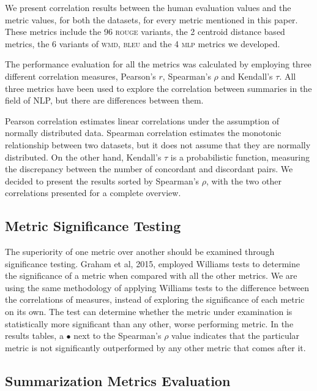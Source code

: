 \documentclass[11pt,a4paper]{article}
\newcommand{\rouge}{\textsc{rouge}\xspace}
\newcommand{\bleu}{\textsc{bleu}\xspace}
\newcommand{\mlp}{\textsc{mlp}\xspace}
\newcommand{\wmd}{\textsc{wmd}\xspace}
\begin{document}
We present correlation results between the human evaluation values and the metric 
values, for both the datasets, for every metric mentioned in this paper. These 
metrics include the 96 \rouge variants, the 2 centroid distance based metrics, 
the 6 variants of \wmd, \bleu and the 4 \mlp metrics we developed.

The performance evaluation for all the metrics was calculated by employing three 
different correlation measures, Pearson's $r$, Spearman's $\rho$ and Kendall's $\tau$. 
All three metrics have been used to explore the correlation between summaries in 
the field of NLP, but there are differences between them.

Pearson correlation estimates linear correlations under the assumption of normally 
distributed data. Spearman correlation estimates the monotonic relationship between 
two datasets, but it does not assume that they are normally distributed. On the other hand, 
Kendall's $\tau$ is a probabilistic function, measuring the discrepancy between the number 
of concordant and discordant pairs. We decided to present the results sorted by Spearman's $\rho$, 
with the two other correlations presented for a complete overview.


\subsection{Metric Significance Testing}
\label{ssec:significance}

The superiority of one metric over another should be examined through significance testing. 
Graham et al, 2015, employed Williams tests to determine the significance of a metric when 
compared with all the other metrics. We are using the same methodology of applying Williams 
tests to the difference between the correlations of measures, instead of exploring the 
significance of each metric on its own. The test can determine whether the metric under 
examination is statistically more  significant than any other, worse performing metric.
In the results tables, a  $\bullet$ next to the Spearman's $\rho$ value indicates that 
the particular metric is not significantly outperformed by any other metric that comes after it.

\subsection{Summarization Metrics Evaluation}
\label{ssec:evaluation}
\end{document}
